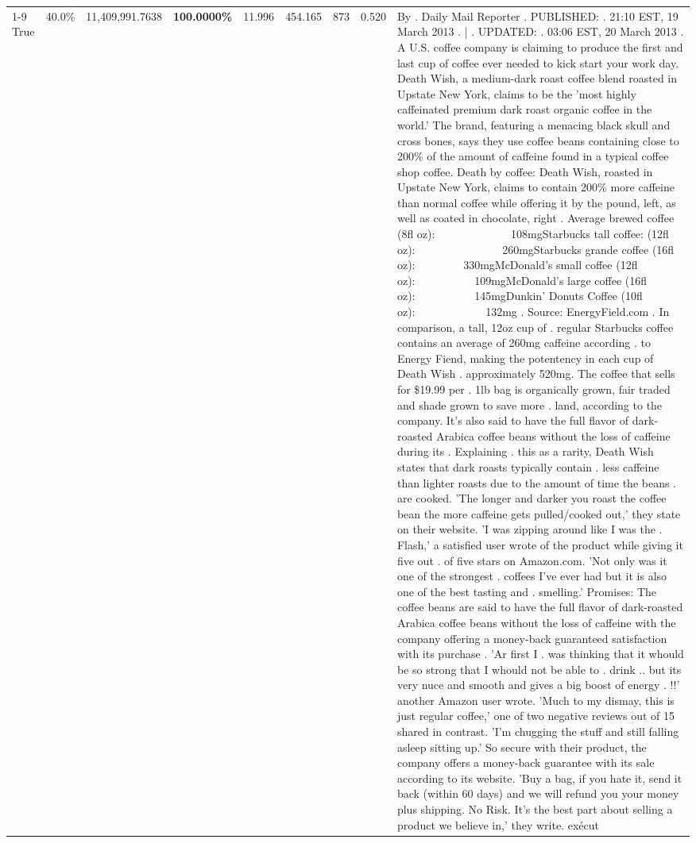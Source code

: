 \begin{table}[H]
{\begin{tabular}{lllrlllll}
\cline{1-9}
True & 40.0\% & 11,409,991.7638 & \bfseries \color{red} 100.0000\% & 11.996 & 454.165 & 873 & 0.520 & By . Daily Mail Reporter . PUBLISHED: . 21:10 EST, 19 March 2013 . | . UPDATED: . 03:06 EST, 20 March 2013 . A U.S. coffee company is claiming to produce the first and last cup of coffee ever needed to kick start your work day. Death Wish, a medium-dark roast coffee blend roasted in Upstate New York, claims to be the 'most highly caffeinated premium dark roast organic coffee in the world.' The brand, featuring a menacing black skull and cross bones, says they use coffee beans containing close to 200\% of the amount of caffeine found in a typical coffee shop coffee. Death by coffee: Death Wish, roasted in Upstate New York, claims to contain 200\% more caffeine than normal coffee while offering it by the pound, left, as well as coated in chocolate, right . Average brewed coffee (8fl oz):              108mgStarbucks tall coffee: (12fl oz):                260mgStarbucks grande coffee (16fl oz):         330mgMcDonald's small coffee (12fl oz):           109mgMcDonald's large coffee (16fl oz):           145mgDunkin' Donuts Coffee (10fl oz):             132mg . Source: EnergyField.com . In comparison, a tall, 12oz cup of . regular Starbucks coffee contains an average of 260mg caffeine according . to Energy Fiend, making the potentency in each cup of Death Wish . approximately 520mg. The coffee that sells for \$19.99 per . 1lb bag is organically grown, fair traded and shade grown to save more . land, according to the company. It's also said to have the full flavor of dark-roasted Arabica coffee beans without the loss of caffeine during its . Explaining . this as a rarity, Death Wish states that dark roasts typically contain . less caffeine than lighter roasts due to the amount of time the beans . are cooked. 'The longer and darker you roast the coffee bean the more caffeine gets pulled/cooked out,' they state on their website. 'I was zipping around like I was the . Flash,' a satisfied user wrote of the product while giving it five out . of five stars on Amazon.com. 'Not only was it one of the strongest . coffees I've ever had but it is also one of the best tasting and . smelling.’ Promises: The coffee beans are said to have the full flavor of dark-roasted Arabica coffee beans without the loss of caffeine with the company offering a money-back guaranteed satisfaction with its purchase . 'Ar first I . was thinking that it whould be so strong that I whould not be able to . drink .. but its very nuce and smooth and gives a big boost of energy . !!' another Amazon user wrote. 'Much to my dismay, this is just regular coffee,' one of two negative reviews out of 15 shared in contrast. 'I'm chugging the stuff and still falling asleep sitting up.' So secure with their product, the company offers a money-back guarantee with its sale according to its website. 'Buy a bag, if you hate it, send it back (within 60 days) and we will refund you your money plus shipping. No Risk. It’s the best part about selling a product we believe in,' they write. exécut \\

\end{tabular}}
\end{table}

